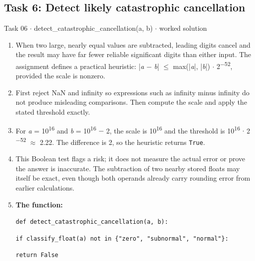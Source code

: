 \documentclass[11pt]{article}
\begin{document}
\begin{keepsection}\subsection{Task 6: Detect likely catastrophic cancellation}

\begin{workedbox}{Task 06 \ensuremath{\cdot} detect\_catastrophic\_cancellation(a, b) \ensuremath{\cdot} worked solution}
\begin{enumerate}
\item When two large, nearly equal values are subtracted, leading digits cancel and the result may have far fewer reliable significant digits than either input. The assignment defines a practical heuristic: |\textit{a} \ensuremath{-} \textit{b}| \ensuremath{\leq} max(|\textit{a}|, |\textit{b}|) \ensuremath{\cdot} 2\textsuperscript{\ensuremath{-}52}, provided the scale is nonzero.
\item First reject NaN and infinity so expressions such as infinity minus infinity do not produce misleading comparisons. Then compute the scale and apply the stated threshold exactly.
\item For \textit{a} = 10\textsuperscript{16} and \textit{b} = 10\textsuperscript{16} \ensuremath{-} 2, the scale is 10\textsuperscript{16} and the threshold is 10\textsuperscript{16} \ensuremath{\cdot} 2\textsuperscript{\ensuremath{-}52} \ensuremath{\approx} 2.22. The difference is 2, so the heuristic returns \texttt{True}.
\item This Boolean test flags a risk; it does not measure the actual error or prove the answer is inaccurate. The subtraction of two nearby stored floats may itself be exact, even though both operands already carry rounding error from earlier calculations.
\item {}
\textbf{The function:}
\begin{tcolorbox}[colback=Paperblue,colframe=Paperblue,boxrule=0pt,arc=0pt,left=7pt,right=7pt,top=5pt,bottom=5pt]\small\sloppy
\noindent\hspace*{0em}\texttt{def detect\_catastrophic\_cancellation(a, b):}\par
\noindent\hspace*{1em}\texttt{if classify\_float(a) not in \{"zero", "subnormal", "normal"\}:}\par
\noindent\hspace*{3em}\texttt{return False}\par

\end{tcolorbox}
\end{enumerate}
\end{workedbox}
\end{keepsection}
\end{document}
